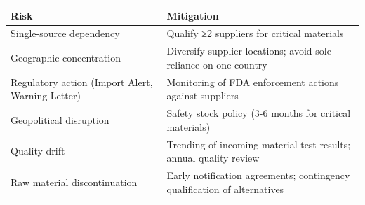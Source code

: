 \documentclass[
  11pt,
  a4paper,
]{report}
\begin{document}
\begin{longtable}[]{@{}ll@{}}
\toprule
\begin{minipage}[b]{0.33\columnwidth}\raggedright
Risk\strut
\end{minipage} & \begin{minipage}[b]{0.61\columnwidth}\raggedright
Mitigation\strut
\end{minipage}\tabularnewline
\midrule
\endhead
\begin{minipage}[t]{0.33\columnwidth}\raggedright
Single-source dependency\strut
\end{minipage} & \begin{minipage}[t]{0.61\columnwidth}\raggedright
Qualify ≥2 suppliers for critical materials\strut
\end{minipage}\tabularnewline
\begin{minipage}[t]{0.33\columnwidth}\raggedright
Geographic concentration\strut
\end{minipage} & \begin{minipage}[t]{0.61\columnwidth}\raggedright
Diversify supplier locations; avoid sole reliance on one country\strut
\end{minipage}\tabularnewline
\begin{minipage}[t]{0.33\columnwidth}\raggedright
Regulatory action (Import Alert, Warning Letter)\strut
\end{minipage} & \begin{minipage}[t]{0.61\columnwidth}\raggedright
Monitoring of FDA enforcement actions against suppliers\strut
\end{minipage}\tabularnewline
\begin{minipage}[t]{0.33\columnwidth}\raggedright
Geopolitical disruption\strut
\end{minipage} & \begin{minipage}[t]{0.61\columnwidth}\raggedright
Safety stock policy (3-6 months for critical materials)\strut
\end{minipage}\tabularnewline
\begin{minipage}[t]{0.33\columnwidth}\raggedright
Quality drift\strut
\end{minipage} & \begin{minipage}[t]{0.61\columnwidth}\raggedright
Trending of incoming material test results; annual quality review\strut
\end{minipage}\tabularnewline
\begin{minipage}[t]{0.33\columnwidth}\raggedright
Raw material discontinuation\strut
\end{minipage} & \begin{minipage}[t]{0.61\columnwidth}\raggedright
Early notification agreements; contingency qualification of
alternatives\strut
\end{minipage}\tabularnewline
\bottomrule
\end{longtable}
\end{document}
